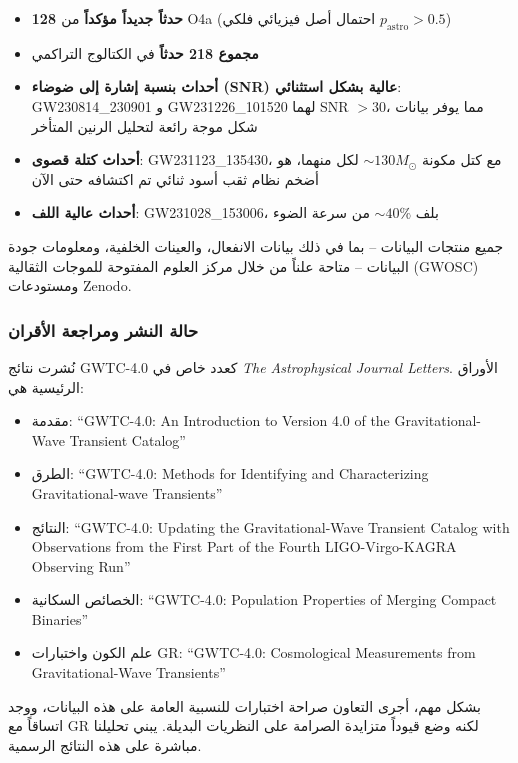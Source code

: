 \documentclass[11pt,a4paper]{article}
\theoremstyle{remark}
\begin{document}
	\begin{itemize}
		\item \textbf{128 حدثاً جديداً مؤكداً} من O4a (احتمال أصل فيزيائي فلكي $p_{\text{astro}} > 0.5$)
		\item \textbf{مجموع 218 حدثاً} في الكتالوج التراكمي
		\item \textbf{أحداث بنسبة إشارة إلى ضوضاء (SNR) عالية بشكل استثنائي}: GW230814\_230901 و GW231226\_101520 لهما SNR $> 30$، مما يوفر بيانات شكل موجة رائعة لتحليل الرنين المتأخر
		\item \textbf{أحداث كتلة قصوى}: GW231123\_135430، مع كتل مكونة $\sim 130 M_\odot$ لكل منهما، هو أضخم نظام ثقب أسود ثنائي تم اكتشافه حتى الآن
		\item \textbf{أحداث عالية اللف}: GW231028\_153006، بلف $\sim 40\%$ من سرعة الضوء
	\end{itemize}
	
	جميع منتجات البيانات – بما في ذلك بيانات الانفعال، والعينات الخلفية، ومعلومات جودة البيانات – متاحة علناً من خلال مركز العلوم المفتوحة للموجات الثقالية (GWOSC) ومستودعات Zenodo.
	
	\subsubsection{حالة النشر ومراجعة الأقران}
	
	نُشرت نتائج GWTC-4.0 كعدد خاص في \textit{The Astrophysical Journal Letters}. الأوراق الرئيسية هي:
	
	\begin{itemize}
		\item مقدمة: ``GWTC-4.0: An Introduction to Version 4.0 of the Gravitational-Wave Transient Catalog''
		\item الطرق: ``GWTC-4.0: Methods for Identifying and Characterizing Gravitational-wave Transients''
		\item النتائج: ``GWTC-4.0: Updating the Gravitational-Wave Transient Catalog with Observations from the First Part of the Fourth LIGO-Virgo-KAGRA Observing Run''
		\item الخصائص السكانية: ``GWTC-4.0: Population Properties of Merging Compact Binaries''
		\item علم الكون واختبارات GR: ``GWTC-4.0: Cosmological Measurements from Gravitational-Wave Transients''
	\end{itemize}
	
	بشكل مهم، أجرى التعاون صراحة اختبارات للنسبية العامة على هذه البيانات، ووجد اتساقاً مع GR لكنه وضع قيوداً متزايدة الصرامة على النظريات البديلة. يبني تحليلنا مباشرة على هذه النتائج الرسمية.
	
\end{document}
